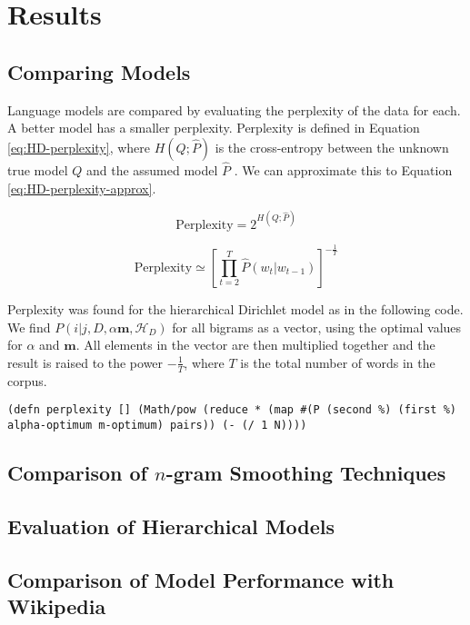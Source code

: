 \chapter{Results}

\section{Comparing Models}

Language models are compared by evaluating the perplexity of the data for each. A better model has a smaller perplexity. Perplexity is defined in Equation \ref{eq:HD-perplexity}, where $H(Q;\hat{P})$ is the cross-entropy between the unknown true model $Q$ and the assumed model $\hat{P}$ \cite{mackay1995hierarchical}. We can approximate this to Equation \ref{eq:HD-perplexity-approx}.

\begin{equation}
\text{Perplexity}=2^{H(Q;\hat{P})}
\label{eq:HD-perplexity}
\end{equation}

\begin{equation}
\text{Perplexity}\simeq\left[\prod_{t=2}^{T}\hat{P}(w_{t}|w_{t-1})\right]^{-\frac{1}{T}}
\label{eq:HD-perplexity-approx}
\end{equation}

Perplexity was found for the hierarchical Dirichlet model as in the following code. We find $P(i|j,D,\alpha\boldsymbol{m},\mathscr{H}_{D})$ for all bigrams as a vector, using the optimal values for $\alpha$ and $\boldsymbol{m}$. All elements in the vector are then multiplied together and the result is raised to the power $-\frac{1}{T}$, where $T$ is the total number of words in the corpus.

\begin{lstlisting}
(defn perplexity [] (Math/pow (reduce * (map #(P (second %) (first %) alpha-optimum m-optimum) pairs)) (- (/ 1 N))))
\end{lstlisting}

\section{Comparison of $n$-gram Smoothing Techniques}


\section{Evaluation of Hierarchical Models}


\section{Comparison of Model Performance with Wikipedia}

